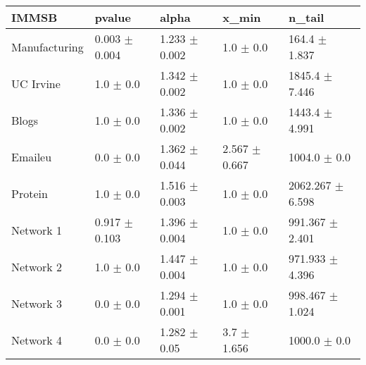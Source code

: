 \begin{tabular}{@{}lllll@{}}
\toprule

\textbf{IMMSB} & pvalue & alpha & x\_min & n\_tail \\\midrule

Manufacturing & 0.003 \(\pm\) 0.004 & 1.233 \(\pm\) 0.002 & 1.0 \(\pm\)
0.0 & 164.4 \(\pm\) 1.837 \\
UC Irvine & 1.0 \(\pm\) 0.0 & 1.342 \(\pm\) 0.002 & 1.0 \(\pm\)
0.0 & 1845.4 \(\pm\) 7.446 \\
Blogs & 1.0 \(\pm\) 0.0 & 1.336 \(\pm\) 0.002 & 1.0 \(\pm\) 0.0 & 1443.4
\(\pm\) 4.991 \\
Emaileu & 0.0 \(\pm\) 0.0 & 1.362 \(\pm\) 0.044 & 2.567 \(\pm\)
0.667 & 1004.0 \(\pm\) 0.0 \\
Protein & 1.0 \(\pm\) 0.0 & 1.516 \(\pm\) 0.003 & 1.0 \(\pm\)
0.0 & 2062.267 \(\pm\) 6.598 \\
Network 1 & 0.917 \(\pm\) 0.103 & 1.396 \(\pm\) 0.004 & 1.0 \(\pm\)
0.0 & 991.367 \(\pm\) 2.401 \\
Network 2 & 1.0 \(\pm\) 0.0 & 1.447 \(\pm\) 0.004 & 1.0 \(\pm\)
0.0 & 971.933 \(\pm\) 4.396 \\
Network 3 & 0.0 \(\pm\) 0.0 & 1.294 \(\pm\) 0.001 & 1.0 \(\pm\)
0.0 & 998.467 \(\pm\) 1.024 \\
Network 4 & 0.0 \(\pm\) 0.0 & 1.282 \(\pm\) 0.05 & 3.7 \(\pm\)
1.656 & 1000.0 \(\pm\) 0.0 \\

\bottomrule
\end{tabular}
